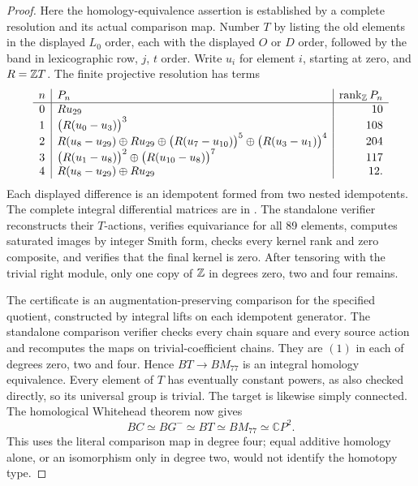 \begin{proof}
Here the homology-equivalence assertion is established by a complete
resolution and its actual comparison map. Number $T$ by listing
the old elements in the displayed $L_0$ order, each with the
displayed $O$ or $D$ order, followed by the band in lexicographic
row, $j$, $t$ order. Write $u_i$ for element $i$, starting at zero,
and $R=\mathbb Z T$. The finite projective resolution has terms
\[
\begin{array}{c|l|r}
 n&P_n&\operatorname{rank}_{\mathbb Z}P_n\\\hline
 0&Ru_{29}&10\\
 1&\bigl(R(u_0-u_3)\bigr)^3&108\\
 2&R(u_8-u_{29})\oplus Ru_{29}\oplus
        \bigl(R(u_7-u_{10})\bigr)^5\oplus
        \bigl(R(u_3-u_1)\bigr)^4&204\\
 3&\bigl(R(u_1-u_8)\bigr)^2\oplus
        \bigl(R(u_{10}-u_8)\bigr)^7&117\\
 4&R(u_8-u_{29})\oplus Ru_{29}&12.
\end{array}
\]
Each displayed difference is an idempotent formed from two nested
idempotents. The complete integral differential matrices are in
.
The standalone verifier reconstructs their $T$-actions, verifies
equivariance for all 89 elements, computes saturated images by
integer Smith form, checks every kernel rank and zero composite,
and verifies that the final kernel is zero. After tensoring with
the trivial right module, only one copy of $\mathbb Z$ in degrees
zero, two and four remains.

The certificate
is an augmentation-preserving comparison for the specified quotient,
constructed by integral lifts on each idempotent generator. The
standalone comparison verifier checks every chain square and every
source action and recomputes the maps on trivial-coefficient chains.
They are $(1)$ in each of degrees zero, two and four. Hence
$BT\to BM_{77}$ is an integral homology equivalence. Every element
of $T$ has eventually constant powers, as also checked directly,
so its universal group is trivial. The target is likewise simply
connected. The homological Whitehead theorem now gives
\[
 BC\simeq BG^-\simeq BT\simeq BM_{77}\simeq\mathbb CP^2.
\]
This uses the literal comparison map in degree four; equal additive
homology alone, or an isomorphism only in degree two, would not
identify the homotopy type.
\end{proof}

